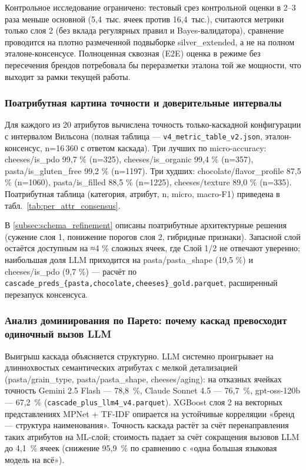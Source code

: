 Контрольное исследование ограничено: тестовый срез контрольной оценки в 2--3 раза меньше основной (5,4~тыс. ячеек против 16,4~тыс.), считаются метрики только слоя 2 (без вклада регулярных правил и Bayes-валидатора), сравнение проводится на плотно размеченной подвыборке silver\_extended, а не на полном эталоне-консенсусе. Полноценная сквозная (E2E) оценка в режиме без пересечения брендов потребовала бы переразметки эталона той же мощности, что выходит за рамки текущей работы.

\subsubsection{Поатрибутная картина точности и доверительные интервалы}
\label{subsec:per_attribute_picture}

Для каждого из 20 атрибутов вычислена точность только-каскадной конфигурации с интервалом Вильсона (полная таблица — \texttt{v4\_metric\_table\_v2.json}, эталон-консенсус, n=16\,360 с ответом каскада). Три лучших по micro-accuracy: cheeses/is\_pdo 99,7 \% (n=325), cheeses/is\_organic 99,4 \% (n=357), pasta/is\_gluten\_free 99,2 \% (n=1197). Три худших: chocolate/flavor\_profile 87,5 \% (n=1060), pasta/is\_filled 88,5 \% (n=1225), cheeses/texture 89,0 \% (n=335). Поатрибутная таблица (категория, атрибут, n, micro, macro-F1) приведена в табл.~\ref{tab:per_attr_consensus}.



В \ref{subsec:schema_refinement} описаны поатрибутные архитектурные решения (сужение слоя 1, понижение порогов слоя 2, гибридные признаки). Запасной слой остаётся доступным на ≈4 \% сложных ячеек, где Слой 1/2 не отвечают уверенно; наибольшая доля LLM приходится на pasta/pasta\_shape (19,5 \%) и cheeses/is\_pdo (9,7 \%) — расчёт по \texttt{cascade\_preds\_\{pasta,chocolate,cheeses\}\_gold.parquet}, расширенный перезапуск консенсуса.

\subsubsection{Анализ доминирования по Парето: почему каскад превосходит одиночный вызов LLM}

Выигрыш каскада объясняется структурно. LLM системно проигрывает на длиннохвостых семантических атрибутах с мелкой детализацией (pasta/grain\_type, pasta/pasta\_shape, cheeses/aging): на отказных ячейках точность Gemini 2.5 Flash — 78,8~\%, Claude Sonnet 4.5 — 76,7~\%, gpt-oss-120b — 67,2~\% (\texttt{cascade\_plus\_llm4\_v4.parquet}). XGBoost слоя 2 на векторных представлениях MPNet + TF-IDF опирается на устойчивые корреляции «бренд — структура наименования». Точность каскада растёт за счёт перенаправления таких атрибутов на ML-слой; стоимость падает за счёт сокращения вызовов LLM до 4,1~\% ячеек (снижение 95,9~\% по сравнению с «одна большая языковая модель на всё»).

